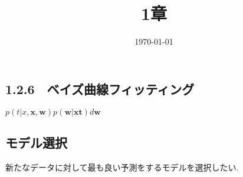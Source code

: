\documentclass[11pt,a4paper]{jsarticle}
\begin{document}
\title{1章}
\date{\today}
\maketitle
\subsection{1.2.6　ベイズ曲線フィッティング}
$p(t|x, \textbf{x}, \textbf{w})p(\textbf{w}|\textbf{x}\textbf{t})d\textbf{w}$
\subsection{モデル選択}
新たなデータに対して最も良い予測をするモデルを選択したい.
\end{document}

